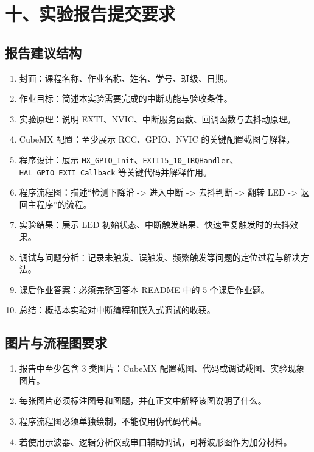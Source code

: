 \documentclass[
  chinese,
  UTF8,
  oneside,
  openany]{ctexbook}
\providecommand{\tightlist}{%
  \setlength{\itemsep}{0pt}\setlength{\parskip}{0pt}}
\begin{document}
\section{十、实验报告提交要求}\label{ux5341ux5b9eux9a8cux62a5ux544aux63d0ux4ea4ux8981ux6c42}

\subsection{报告建议结构}\label{ux62a5ux544aux5efaux8baeux7ed3ux6784-2}

\begin{enumerate}
\def\labelenumi{\arabic{enumi}.}
\tightlist
\item
  封面：课程名称、作业名称、姓名、学号、班级、日期。
\item
  作业目标：简述本实验需要完成的中断功能与验收条件。
\item
  实验原理：说明 EXTI、NVIC、中断服务函数、回调函数与去抖动原理。
\item
  CubeMX 配置：至少展示 RCC、GPIO、NVIC 的关键配置截图与解释。
\item
  程序设计：展示
  \texttt{MX\_GPIO\_Init}、\texttt{EXTI15\_10\_IRQHandler}、\texttt{HAL\_GPIO\_EXTI\_Callback}
  等关键代码并解释作用。
\item
  程序流程图：描述``检测下降沿 -\textgreater{} 进入中断 -\textgreater{}
  去抖判断 -\textgreater{} 翻转 LED -\textgreater{} 返回主程序''的流程。
\item
  实验结果：展示 LED 初始状态、中断触发结果、快速重复触发时的去抖效果。
\item
  调试与问题分析：记录未触发、误触发、频繁触发等问题的定位过程与解决方法。
\item
  课后作业答案：必须完整回答本 README 中的 5 个课后作业题。
\item
  总结：概括本实验对中断编程和嵌入式调试的收获。
\end{enumerate}

\subsection{图片与流程图要求}\label{ux56feux7247ux4e0eux6d41ux7a0bux56feux8981ux6c42-2}

\begin{enumerate}
\def\labelenumi{\arabic{enumi}.}
\tightlist
\item
  报告中至少包含 3 类图片：CubeMX
  配置截图、代码或调试截图、实验现象图片。
\item
  每张图片必须标注图号和图题，并在正文中解释该图说明了什么。
\item
  程序流程图必须单独绘制，不能仅用伪代码代替。
\item
  若使用示波器、逻辑分析仪或串口辅助调试，可将波形图作为加分材料。
\end{enumerate}
\end{document}
